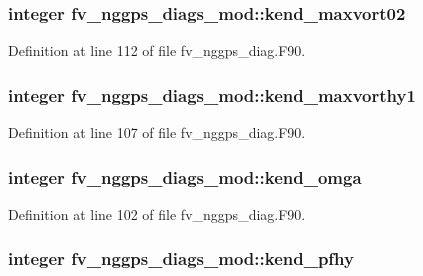 \subsubsection[{kend\-\_\-maxvort02}]{\setlength{\rightskip}{0pt plus 5cm}integer fv\-\_\-nggps\-\_\-diags\-\_\-mod\-::kend\-\_\-maxvort02\hspace{0.3cm}{\ttfamily [private]}}\label{classfv__nggps__diags__mod_a92c55d7b8d59128cd1252c604178154a}


Definition at line 112 of file fv\-\_\-nggps\-\_\-diag.\-F90.

\subsubsection[{kend\-\_\-maxvorthy1}]{\setlength{\rightskip}{0pt plus 5cm}integer fv\-\_\-nggps\-\_\-diags\-\_\-mod\-::kend\-\_\-maxvorthy1\hspace{0.3cm}{\ttfamily [private]}}\label{classfv__nggps__diags__mod_a657cc9bef8d0085fd26b49e3bf52caae}


Definition at line 107 of file fv\-\_\-nggps\-\_\-diag.\-F90.

\subsubsection[{kend\-\_\-omga}]{\setlength{\rightskip}{0pt plus 5cm}integer fv\-\_\-nggps\-\_\-diags\-\_\-mod\-::kend\-\_\-omga\hspace{0.3cm}{\ttfamily [private]}}\label{classfv__nggps__diags__mod_a4e11455c15981a042cd6cc91bd000576}


Definition at line 102 of file fv\-\_\-nggps\-\_\-diag.\-F90.

\subsubsection[{kend\-\_\-pfhy}]{\setlength{\rightskip}{0pt plus 5cm}integer fv\-\_\-nggps\-\_\-diags\-\_\-mod\-::kend\-\_\-pfhy\hspace{0.3cm}{\ttfamily [private]}}\label{classfv__nggps__diags__mod_a52ec4ebc17baed9773c0e0facc94d80f}


